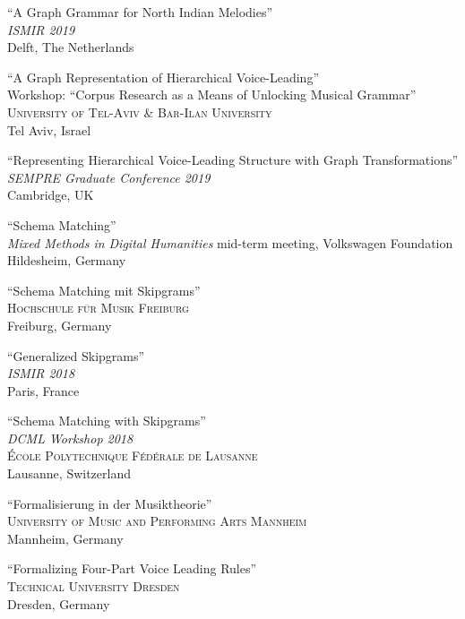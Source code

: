 \documentclass[10pt]{scrartcl}
\newcommand{\margintext}[1]{\marginpar{\raggedleft\itshape\small#1}}
\newcommand{\entry}[1]{\vphantom{x}\margintext{#1}}
\begin{document}
\entry{2019}%
\contrib \poster \enquote{A Graph Grammar for North Indian Melodies}
\\
\textit{ISMIR 2019}\\
Delft, The Netherlands

\invited \enquote{A Graph Representation of Hierarchical Voice-Leading}
\\
Workshop: \enquote{Corpus Research as a Means of Unlocking Musical Grammar}\\
\textsc{University of Tel-Aviv \& Bar-Ilan University}\\
Tel Aviv, Israel

\poster \enquote{Representing Hierarchical Voice-Leading Structure with Graph Transformations}\\
\textit{SEMPRE Graduate Conference 2019}\\
Cambridge, UK

\contrib \enquote{Schema Matching}
\\
\textit{Mixed Methods in Digital Humanities} mid-term meeting, Volkswagen Foundation\\
Hildesheim, Germany

\invited \enquote{Schema Matching mit Skipgrams}
\\
\textsc{Hochschule für Musik Freiburg}\\
Freiburg, Germany

\entry{2018}%
\contrib \poster \enquote{Generalized Skipgrams}
\\
\textit{ISMIR 2018}\\
Paris, France

\invited \enquote{Schema Matching with Skipgrams}
\\
\textit{DCML Workshop 2018}\\
\textsc{École Polytechnique Fédérale de Lausanne}\\
Lausanne, Switzerland

\invited \enquote{Formalisierung in der Musiktheorie}
\\
\textsc{University of Music and Performing Arts Mannheim}\\
Mannheim, Germany

\entry{2017}%
\invited \enquote{Formalizing Four-Part Voice Leading Rules}
\\
\textsc{Technical University Dresden}\\
Dresden, Germany
\end{document}
